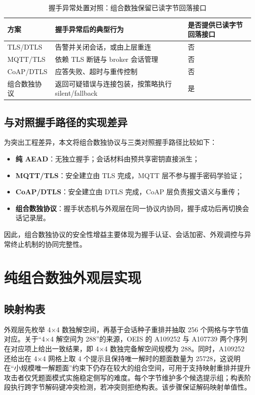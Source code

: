 \begin{table}[H]
\centering
\small
\caption{握手异常处置对照：组合数独保留已读字节回落接口}
\label{tab:c3-fallback-compare}
\begin{tabular}{p{2.3cm}p{4.9cm}p{4.6cm}}
\toprule
方案 & 握手异常后的典型行为 & 是否提供已读字节回落接口 \\
\midrule
TLS/DTLS & 告警并关闭会话，或由上层重连 & 否 \\
\midrule
MQTT/TLS & 依赖 TLS 断链与 broker 会话管理 & 否 \\
\midrule
CoAP/DTLS & 应答失败、超时与重传控制 & 否 \\
\midrule
组合数独协议 & 返回可疑错误与连接包装，按策略执行 silent/fallback & 是 \\
\bottomrule
\end{tabular}
\end{table}

\subsection{与对照握手路径的实现差异}
为突出工程差异，本文将组合数独协议与三类对照握手路径比较如下：
\begin{itemize}
  \item \textbf{纯 AEAD}：无独立握手；会话材料由预共享密钥直接派生；
  \item \textbf{MQTT/TLS}：安全建立由 TLS 完成，MQTT 层不参与握手密码学验证；
  \item \textbf{CoAP/DTLS}：安全建立由 DTLS 完成，CoAP 层负责报文语义与重传；
  \item \textbf{组合数独协议}：握手状态机与外观层在同一协议内协同，握手成功后再切换会话记录层。
\end{itemize}

因此，组合数独协议的安全性增益主要体现为握手认证、会话加密、外观调控与异常终止机制的协同完整性。

\section{纯组合数独外观层实现}
\subsection{映射构表}
外观层先枚举 4$\times$4 数独解空间，再基于会话种子重排并抽取 256 个网格与字节值对应。关于“4$\times$4 解空间为 288”的来源，OEIS 的 A109252 与 A107739 两个序列在对应项上给出一致结果，即 4$\times$4 数独完备解空间规模为 288\cite{oeisA109252,oeisA107739}。同时，A109252 还给出在 4$\times$4 网格上取 4 个提示且保持唯一解时的题面数量为 25728，这说明在“小规模唯一解题面”约束下仍存在较大的组合空间，可用于支持映射重排并提升攻击者仅凭题面模式实施稳定侧写的难度\cite{oeisA109252}。每个字节维护多个候选提示组；构表阶段执行跨字节解码键冲突检测，若冲突则拒绝构表。该步骤保证解码映射单值性。

